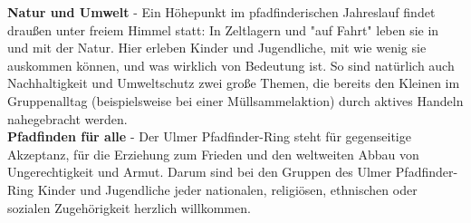 \textbf{Natur und Umwelt} - Ein Höhepunkt im pfadfinderischen Jahreslauf findet draußen unter 
freiem Himmel statt: In Zeltlagern und "auf Fahrt" leben sie in und mit der Natur. Hier erleben 
Kinder und Jugendliche, mit wie wenig sie auskommen können, und was wirklich von Bedeutung ist. So 
sind natürlich auch Nachhaltigkeit und Umweltschutz zwei große Themen, die bereits den Kleinen im 
Gruppenalltag (beispielsweise bei einer Müllsammelaktion) durch aktives Handeln nahegebracht werden. 
\\

\textbf{Pfadfinden für alle} - Der Ulmer Pfadfinder-Ring steht für gegenseitige Akzeptanz, für die 
Erziehung zum Frieden und den weltweiten Abbau von Ungerechtigkeit und Armut. Darum sind bei den 
Gruppen des Ulmer Pfadfinder-Ring Kinder und Jugendliche jeder nationalen, religiösen, ethnischen 
oder sozialen Zugehörigkeit herzlich willkommen.
